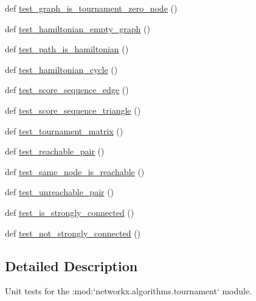 \begin{DoxyCompactItemize}
def \hyperlink{namespacenetworkx_1_1algorithms_1_1tests_1_1test__tournament_a0905d2accdf61cdb6c71fe6a1751e3c1}{test\+\_\+graph\+\_\+is\+\_\+tournament\+\_\+zero\+\_\+node} ()
\item 
def \hyperlink{namespacenetworkx_1_1algorithms_1_1tests_1_1test__tournament_a159eabe414bf0034fbd6e593835fe50b}{test\+\_\+hamiltonian\+\_\+empty\+\_\+graph} ()
\item 
def \hyperlink{namespacenetworkx_1_1algorithms_1_1tests_1_1test__tournament_a4582f3bae41585936c883523a0650ddc}{test\+\_\+path\+\_\+is\+\_\+hamiltonian} ()
\item 
def \hyperlink{namespacenetworkx_1_1algorithms_1_1tests_1_1test__tournament_afd7fb952379b24e8c51aaacf4b259dbd}{test\+\_\+hamiltonian\+\_\+cycle} ()
\item 
def \hyperlink{namespacenetworkx_1_1algorithms_1_1tests_1_1test__tournament_aaf05714c93673b6b73587b2dfd76f822}{test\+\_\+score\+\_\+sequence\+\_\+edge} ()
\item 
def \hyperlink{namespacenetworkx_1_1algorithms_1_1tests_1_1test__tournament_a66beff40c869efd1422063719c0216ac}{test\+\_\+score\+\_\+sequence\+\_\+triangle} ()
\item 
def \hyperlink{namespacenetworkx_1_1algorithms_1_1tests_1_1test__tournament_ad495d8546eb0b3fa802bdf0c78cde2d7}{test\+\_\+tournament\+\_\+matrix} ()
\item 
def \hyperlink{namespacenetworkx_1_1algorithms_1_1tests_1_1test__tournament_a4fc6950d496e0f943e7af10c997ef156}{test\+\_\+reachable\+\_\+pair} ()
\item 
def \hyperlink{namespacenetworkx_1_1algorithms_1_1tests_1_1test__tournament_aba33abecfa95b90928894664e3ca01d3}{test\+\_\+same\+\_\+node\+\_\+is\+\_\+reachable} ()
\item 
def \hyperlink{namespacenetworkx_1_1algorithms_1_1tests_1_1test__tournament_aa25b314fff60386b780dbaef07158d07}{test\+\_\+unreachable\+\_\+pair} ()
\item 
def \hyperlink{namespacenetworkx_1_1algorithms_1_1tests_1_1test__tournament_aecf87b70cdd168aefaeef75979f5ab0c}{test\+\_\+is\+\_\+strongly\+\_\+connected} ()
\item 
def \hyperlink{namespacenetworkx_1_1algorithms_1_1tests_1_1test__tournament_aabf81fe8137fb1288ebe1b5dd44e3141}{test\+\_\+not\+\_\+strongly\+\_\+connected} ()
\end{DoxyCompactItemize}


\subsection{Detailed Description}
\begin{DoxyVerb}Unit tests for the :mod:`networkx.algorithms.tournament` module.\end{DoxyVerb}
 

